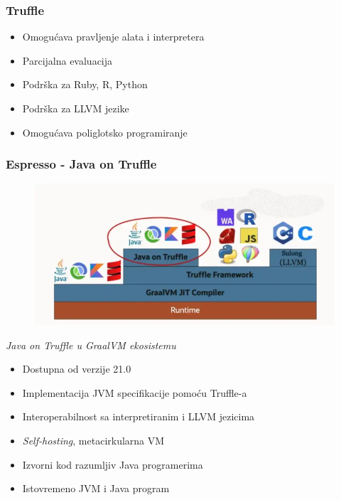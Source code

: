 \documentclass{beamer}
\begin{document}
	
	\begin{frame}
		\frametitle{Truffle}
		 \begin{itemize}
			\item Omogućava pravljenje alata i interpretera
			\item Parcijalna evaluacija
			\item Podrška za Ruby, R, Python
			\item Podrška za LLVM jezike
			\item Omogućava poliglotsko programiranje
		 \end{itemize}
	\end{frame}	

	\begin{frame}
		\frametitle{Espresso - Java on Truffle}

		\begin{figure}
			\begin{center}
				\includegraphics[width=0.5\linewidth]{imgs/java_on_truffle.png}	
			\end{center} 
		\end{figure}

		\center	
		\textit{Java on Truffle u GraalVM ekosistemu}


		\begin{flushleft}
			\begin{itemize}
				\item Dostupna od verzije 21.0
				\item Implementacija JVM specifikacije pomoću Truffle-a
				\item Interoperabilnost sa interpretiranim i LLVM jezicima
				\item \emph{Self-hosting}, metacirkularna VM
				\item Izvorni kod razumljiv Java programerima
				\item Istovremeno JVM i Java program
			\end{itemize}
		\end{flushleft}

	\end{frame}	
\end{document}
